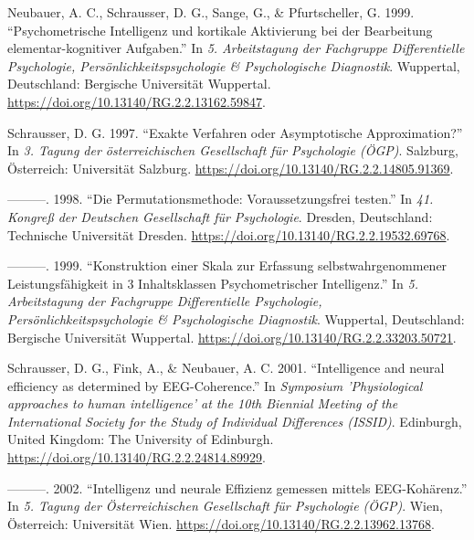 \documentclass[
]{article}
\newlength{\cslhangindent}
\newlength{\cslentryspacingunit} %
\newenvironment{CSLReferences}[2] %
 {%
  \setlength{\parindent}{0pt}
  \ifodd #1
  \let\oldpar\par
  \def\par{\hangindent=\cslhangindent\oldpar}
  \fi
  \setlength{\parskip}{#2\cslentryspacingunit}
 }%
 {}
\begin{document}
\begin{CSLReferences}{1}{0}
\leavevmode{}%
Neubauer, A. C., Schrausser, D. G., Sange, G., \& Pfurtscheller, G.
1999. {``{Psychometrische Intelligenz und kortikale Aktivierung bei der
Bearbeitung elementar-kognitiver Aufgaben}.''} In \emph{{5.
Arbeitstagung der Fachgruppe Differentielle Psychologie,
Persönlichkeitspsychologie \& Psychologische Diagnostik}}. Wuppertal,
Deutschland: {Bergische Universität Wuppertal}.
\url{https://doi.org/10.13140/RG.2.2.13162.59847}.

\leavevmode{}%
Schrausser, D. G. 1997. {``{Exakte Verfahren oder Asymptotische
Approximation?}''} In \emph{{3. Tagung der österreichischen Gesellschaft
für Psychologie (ÖGP)}}. Salzburg, Österreich: {Universität Salzburg}.
\url{https://doi.org/10.13140/RG.2.2.14805.91369}.

\leavevmode{}%
---------. 1998. {``{Die Permutationsmethode: Voraussetzungsfrei
testen}.''} In \emph{{41. Kongreß der Deutschen Gesellschaft für
Psychologie}}. Dresden, Deutschland: {Technische Universität Dresden}.
\url{https://doi.org/10.13140/RG.2.2.19532.69768}.

\leavevmode{}%
---------. 1999. {``{Konstruktion einer Skala zur Erfassung
selbstwahrgenommener Leistungsfähigkeit in 3 Inhaltsklassen
Psychometrischer Intelligenz}.''} In \emph{{5. Arbeitstagung der
Fachgruppe Differentielle Psychologie, Persönlichkeitspsychologie \&
Psychologische Diagnostik}}. Wuppertal, Deutschland: {Bergische
Universität Wuppertal}.
\url{https://doi.org/10.13140/RG.2.2.33203.50721}.

\leavevmode{}%
Schrausser, D. G., Fink, A., \& Neubauer, A. C. 2001. {``{Intelligence
and neural efficiency as determined by EEG-Coherence}.''} In
\emph{{Symposium 'Physiological approaches to human intelligence' at the
10th Biennial Meeting of the International Society for the Study of
Individual Differences (ISSID)}}. Edinburgh, United Kingdom: {The
University of Edinburgh}.
\url{https://doi.org/10.13140/RG.2.2.24814.89929}.

\leavevmode{}%
---------. 2002. {``{Intelligenz und neurale Effizienz gemessen mittels
EEG-Kohärenz}.''} In \emph{{5. Tagung der Österreichischen Gesellschaft
für Psychologie (ÖGP)}}. Wien, Österreich: {Universität Wien}.
\url{https://doi.org/10.13140/RG.2.2.13962.13768}.

\end{CSLReferences}
\end{document}
